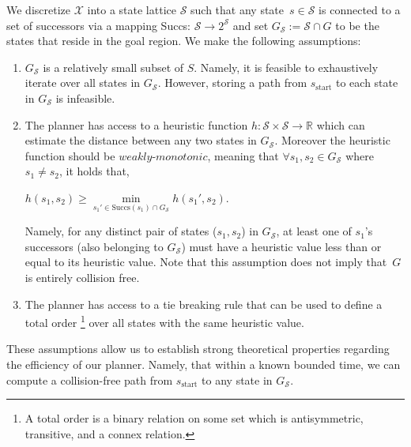 \documentclass[letterpaper]{article} %
\newcommand{\calX}{\ensuremath{\mathcal{X}}\xspace}
\newcommand{\calS}{\ensuremath{\mathcal{S}}\xspace}
\newcommand{\sStart}{\ensuremath{s_{\text{start}}\xspace}}
\begin{document}
We discretize $\calX$ into a state lattice $\calS$ such that any state~$s \in \calS$ is connected to a set of successors via a mapping Succs: $\calS \rightarrow 2^\calS$
and set $G_\calS := \calS \cap G$ to be the states that reside in the goal region.
We make the following assumptions:

\begin{enumerate}[label={\textbf{A\arabic*}}]
  \item \label{assum:1} $G_\calS$ is a relatively small subset of $S$. Namely, it is feasible to exhaustively iterate over all states in $G_\calS$.
However, storing a path from $\sStart$ to each state in $G_\calS$ is infeasible.
  
  \item \label{assum:2} The planner has access to a heuristic function $h: \calS \times \calS \rightarrow \mathbb{R}$ which can estimate the distance between any two states in $G_\calS$. Moreover the heuristic function should be $\textit{weakly-monotonic}$, meaning that $\forall s_1, s_2  \in G_\calS$ where $s_1 \neq s_2 $, it holds that,

  \begin{center}
    $h(s_1, s_2) \geq \min\limits_{s_1' \in \text{Succs}(s_1) \cap G_\calS} h(s_1', s_2)$.
  \end{center}
  Namely, for any distinct pair of states ($s_1, s_2$) in $G_\calS$, at least one of $s_1$'s successors (also belonging to $G_\calS$) must have a heuristic value less than or equal to its heuristic value.
	Note that this assumption does not imply  that~$G$ is entirely collision free.

  \item \label{assum:3} The planner has access to a tie breaking rule that can be used to define a total order \footnote{A total order is a binary relation on some set which is antisymmetric, transitive, and a connex relation.} over all states with the same heuristic value.
  \end{enumerate}

These assumptions allow us to establish strong theoretical properties regarding the efficiency of our planner. Namely, that
within a known bounded time, we can compute a collision-free path from $\sStart$ to any state in $G_\calS$. 
\end{document}
